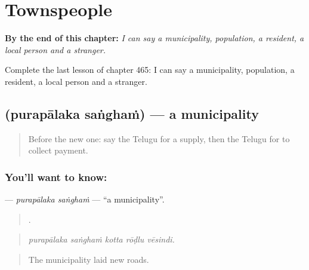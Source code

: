 
\chapter{Townspeople}
\label{ch:te-townspeople}

\begin{chapteropening}
\textbf{By the end of this chapter:} \emph{I can say a municipality, population, a resident, a local person and a stranger.}

Complete the last lesson of chapter 465: I can say a municipality, population, a resident, a local person and a stranger.
\end{chapteropening}

\section[\texorpdfstring{\te{పురపాలక} \te{సంఘం} (purapālaka saṅghaṁ)}{పురపాలక సంఘం (purapālaka saṅghaṁ)}]{  (purapālaka saṅghaṁ) — a municipality}

\label{lesson:TE-C465-purapalaka-sangham}



\begin{quote}
Before the new one: say the Telugu for a supply, then the Telugu for to collect payment.
\end{quote}

\subsection*{You'll want to know:  }
\textbf{ } — \emph{purapālaka saṅghaṁ} — \textquotedblleft{}a municipality\textquotedblright{}.

\begin{quote}
    .
\end{quote}

\begin{quote}
\emph{purapālaka saṅghaṁ kotta rōḍlu vēsindi.}
\end{quote}

\begin{quote}
The municipality laid new roads.
\end{quote}

